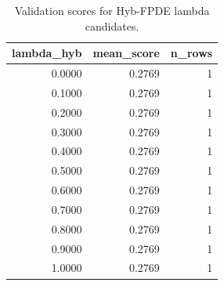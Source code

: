 \begin{table}[t]
\caption{Validation scores for Hyb-FPDE lambda candidates.}
\label{tab:lambda_distribution_computed}
\centering
\begin{tabular}{rrr}
\toprule
lambda\_hyb & mean\_score & n\_rows \\
\midrule
0.0000 & 0.2769 & 1 \\
0.1000 & 0.2769 & 1 \\
0.2000 & 0.2769 & 1 \\
0.3000 & 0.2769 & 1 \\
0.4000 & 0.2769 & 1 \\
0.5000 & 0.2769 & 1 \\
0.6000 & 0.2769 & 1 \\
0.7000 & 0.2769 & 1 \\
0.8000 & 0.2769 & 1 \\
0.9000 & 0.2769 & 1 \\
1.0000 & 0.2769 & 1 \\
\bottomrule
\end{tabular}

\end{table}
